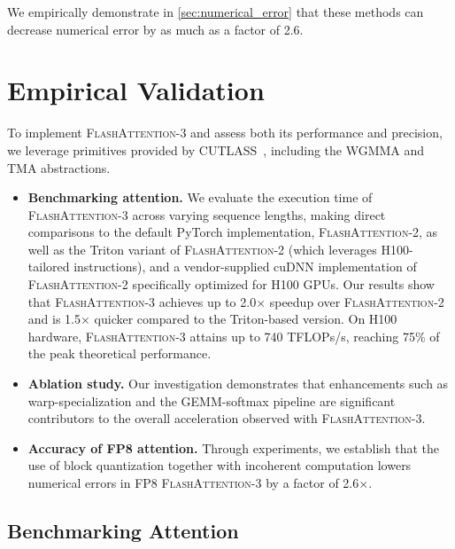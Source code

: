 \begin{algorithm}[H]
\begin{algorithmic}[1]
We empirically demonstrate in \cref{sec:numerical_error} that these methods can decrease numerical error by as much as a factor of 2.6.

\section{Empirical Validation}
\label{sec:exp}

To implement \textsc{FlashAttention-3} and assess both its performance and precision, we leverage primitives provided by CUTLASS~\citep{Thakkar_CUTLASS_2023}, including the WGMMA and TMA abstractions.

\begin{itemize}

\item \textbf{Benchmarking attention.} We evaluate the execution time of \textsc{FlashAttention-3} across varying sequence lengths, making direct comparisons to the default PyTorch implementation, \textsc{FlashAttention-2}, as well as the Triton variant of \textsc{FlashAttention-2} (which leverages H100-tailored instructions), and a vendor-supplied cuDNN implementation of \textsc{FlashAttention-2} specifically optimized for H100 GPUs. Our results show that \textsc{FlashAttention-3} achieves up to 2.0$\times$ speedup over \textsc{FlashAttention-2} and is 1.5$\times$ quicker compared to the Triton-based version. On H100 hardware, \textsc{FlashAttention-3} attains up to 740 TFLOPs/s, reaching 75\% of the peak theoretical performance.
\item \textbf{Ablation study.} Our investigation demonstrates that enhancements such as warp-specialization and the GEMM-softmax pipeline are significant contributors to the overall acceleration observed with \textsc{FlashAttention-3}.
\item \textbf{Accuracy of FP8 attention.} Through experiments, we establish that the use of block quantization together with incoherent computation lowers numerical errors in FP8 \textsc{FlashAttention-3} by a factor of 2.6$\times$.
\end{itemize}

\subsection{Benchmarking Attention}
\label{subsec:benchmark_attn}


\end{algorithmic}
\end{algorithm}
